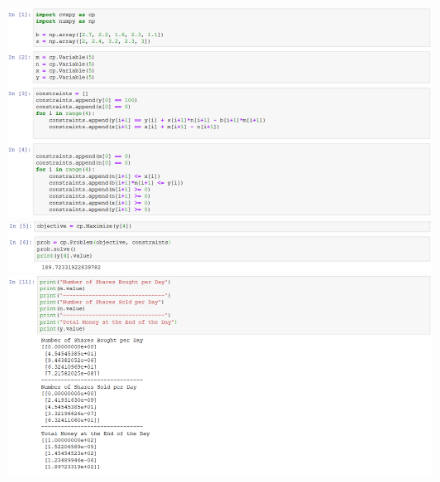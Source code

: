 \documentclass[]{report}
\begin{document}
\begin{figure}
	\centering
	\includegraphics[width=1.2\linewidth]{code_1}
	\includegraphics[width=1.2\linewidth]{code_2}
	\includegraphics[width=1.2\linewidth]{code_3}
	\label{fig:code2}
\end{figure}
\end{document}
